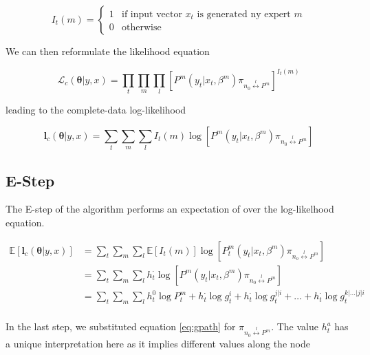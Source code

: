 \documentclass[12pt]{article}
\begin{document}
\begin{equation} \label{eq:indicator}
  I_{t}(m) = \begin{cases} 
     1 & \textrm{if input vector $x_{t}$ is generated ny expert $m$} \\
     0 & \textrm{otherwise}
             \end{cases}
\end{equation}

We can then reformulate the likelihood equation

\begin{equation}  \label{eq:likelihood2}
  \mathcal{L}_{c}(\boldsymbol{\theta}|y,x) = \prod_{t}\prod_{m}\prod_{l}[P^{m}(y_{t}|x_{t},\beta^{m})\pi_{n_{0}\overset{l}{\longleftrightarrow} P^{m}}]^{I_{t}(m)}
\end{equation}

leading to the complete-data log-likelihood

\begin{equation}  \label{eq:loglikelihood2}
  \boldsymbol{l}_{c}(\boldsymbol{\theta}|y,x) = \sum_{t}\sum_{m}\sum_{l}I_{t}(m)\log[P^{m}(y_{t}|x_{t},\beta^{m})\pi_{n_{0}\overset{l}{\longleftrightarrow} P^{m}}]
\end{equation}

\subsection{E-Step}
The E-step of the algorithm performs an expectation of over the log-likelhood equation.

\begin{equation} \label{eq:Estep}
  \begin{split}
  \mathbb{E}\left[\boldsymbol{l}_{c}(\boldsymbol{\theta}|y,x)\right] & = \sum_{t}\sum_{m}\sum_{l}\mathbb{E}\left[I_{t}(m)\right]\log[P^{m}_{t}(y_{t}|x_{t},\beta^{m})\pi_{n_{o}\overset{l}{\longleftrightarrow} P^{m}}] \\
   & = \sum_{t}\sum_{m}\sum_{l}h^{\cdotp}_{t}\log[P^{m}(y_{t}|x_{t},\beta^{m})\pi_{n_{0}\overset{l}{\longleftrightarrow} P^{m}}] \\
   & = \sum_{t}\sum_{m}\sum_{l}h^{0}_{t}\log P^{m}_{t} + h^{\cdotp}_{t} \log g^{i}_{t} + h^{\cdotp}_{t} \log g^{j|i}_{t} + \ldots + h^{\cdotp}_{t} \log g^{k|\dots|j|i}_{t} \\
  \end{split}
\end{equation}

In the last step, we substituted equation \ref{eq:gpath} for $\pi_{n_{0}\overset{l}{\longleftrightarrow} P^{m}}$. The value $h_{t}^{a}$ has a unique interpretation here as it implies different values along the node
\end{document}
